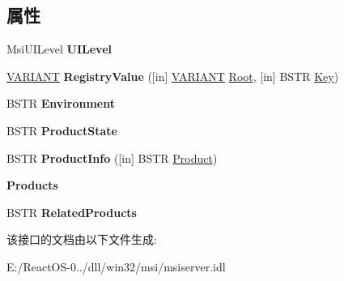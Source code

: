 \subsection*{属性}
\begin{DoxyCompactItemize}
\item 
\mbox{\label{interface_windows_installer_1_1_installer_a23ae415950274351e42c3024638df386}} 
Msi\+U\+I\+Level {\bfseries U\+I\+Level}
\item 
\mbox{\label{interface_windows_installer_1_1_installer_a145a178a9669450781148ed17903156c}} 
\hyperlink{structtag_v_a_r_i_a_n_t}{V\+A\+R\+I\+A\+NT} {\bfseries Registry\+Value} (\mbox{[}in\mbox{]} \hyperlink{structtag_v_a_r_i_a_n_t}{V\+A\+R\+I\+A\+NT} \hyperlink{struct_root}{Root}, \mbox{[}in\mbox{]} B\+S\+TR \hyperlink{struct_key}{Key})
\item 
\mbox{\label{interface_windows_installer_1_1_installer_a08701d07c05f5e7fcfd69153594933f7}} 
B\+S\+TR {\bfseries Environment}
\item 
\mbox{\label{interface_windows_installer_1_1_installer_ae30e918e7446575ed002e5aac649e8e5}} 
B\+S\+TR {\bfseries Product\+State}
\item 
\mbox{\label{interface_windows_installer_1_1_installer_ab8461d756652139f8f459aaf7e47173f}} 
B\+S\+TR {\bfseries Product\+Info} (\mbox{[}in\mbox{]} B\+S\+TR \hyperlink{interface_windows_installer_1_1_product}{Product})
\item 
\mbox{\label{interface_windows_installer_1_1_installer_a826ac15b7f761475a02bbeee12a13f5e}} 
{\bfseries Products}
\item 
\mbox{\label{interface_windows_installer_1_1_installer_af884b5d6d7fd02652a5c884f99121fcc}} 
B\+S\+TR {\bfseries Related\+Products}
\end{DoxyCompactItemize}


该接口的文档由以下文件生成\+:\begin{DoxyCompactItemize}
\item 
E\+:/\+React\+O\+S-\/0../dll/win32/msi/msiserver.\+idl\end{DoxyCompactItemize}
